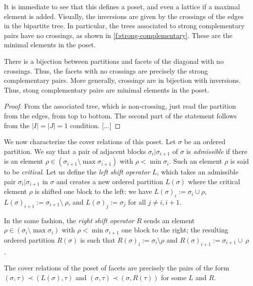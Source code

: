 It is immediate to see that this defines a poset, and even a lattice if a maximal element is added. 
Visually, the inversions are given by the crossings of the edges in the bipartite tree. 
In particular, the trees associated to strong complementary pairs have no crossings, as shown in \cref{f:strong-complementary}.
These are the minimal elements in the poset. 

\begin{proposition}
    \label{p:crossings}
    There is a bijection between partitions and facets of the diagonal with no crossings.
    Thus, the facets with no crossings are precisely the strong complementary pairs. 
    More generally, crossings are in bijection with inversions. 
    Thus, stong complementary pairs are minimal elements in the poset. 
\end{proposition}

\begin{proof}
    From the associated tree, which is non-crossing, just read the partition from the edges, from top to bottom.
    The second part of the statement follows from the $|I|=|J|=1$ condition. [...]
\end{proof}


We now characterize the cover relations of this poset. 
Let $\sigma$ be an ordered partition.
We say that a pair of adjacent blocks $\sigma_i | \sigma_{i+1}$ of $\sigma$ is \emph{admissible} if there is an element $\rho \in (\sigma_{i+1} \setminus \max\sigma_{i+1})$ with $\rho < \min \sigma_{i}$. 
Such an element $\rho$ is said to be \emph{critical}. 
Let us define the \emph{left shift operator} $L$, which takes an admissible pair $\sigma_i | \sigma_{i+1}$ in $\sigma$ and creates a new ordered partition $L(\sigma)$ where the critical element $\rho$ is shifted one block to the left: we have $L(\sigma)_i := \sigma_i \cup \rho$, $L(\sigma)_{i+1} := \sigma_{i+1} \setminus \ \rho$, and $L(\sigma)_{j}:=\sigma_j$ for all $j\neq i, i+1$. 

In the same fashion, the \emph{right shift operator} $R$ sends an element $\rho \in (\sigma_{i} \setminus \max\sigma_{i})$ with $\rho < \min \sigma_{i+1}$ one block to the right; the resulting ordered partition $R(\sigma)$ is such that $R(\sigma)_i := \sigma_i \setminus \rho$ and $R(\sigma)_{i+1} := \sigma_{i+1} \cup \ \rho$.

\begin{thm}
    \label{t:cover-relations}
    The cover relations of the poset of facets are precisely the pairs of the form $(\sigma,\tau) \prec (L(\sigma),\tau)$ and $(\sigma,\tau) \prec (\sigma,R(\tau))$ for some $L$ and $R$. 
\end{thm}

